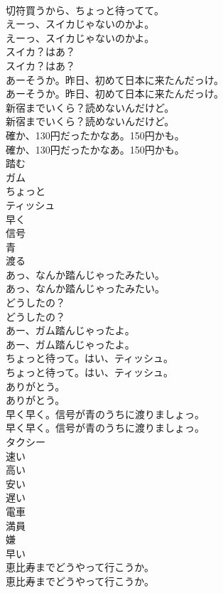 \documentclass[8pt]{extreport}
\begin{document}
\begin{CJK}{UTF8}{min}
\\	切符買うから、ちょっと待ってて。 
\\	えーっ、スイカじゃないのかよ。	
\\	えーっ、スイカじゃないのかよ。 
\\	スイカ？はあ？	
\\	スイカ？はあ？ 
\\	あーそうか。昨日、初めて日本に来たんだっけ。	
\\	あーそうか。昨日、初めて日本に来たんだっけ。 
\\	新宿までいくら？読めないんだけど。	
\\	新宿までいくら？読めないんだけど。 
\\	確か、130円だったかなあ。150円かも。	
\\	確か、130円だったかなあ。150円かも。 
\\	踏む
\\	ガム
\\	ちょっと
\\	ティッシュ
\\	早く
\\	信号
\\	青
\\	渡る
\\	あっ、なんか踏んじゃったみたい。	
\\	あっ、なんか踏んじゃったみたい。 
\\	どうしたの？	
\\	どうしたの？ 
\\	あー、ガム踏んじゃったよ。	
\\	あー、ガム踏んじゃったよ。 
\\	ちょっと待って。はい、ティッシュ。	
\\	ちょっと待って。はい、ティッシュ。 
\\	ありがとう。	
\\	ありがとう。 
\\	早く早く。信号が青のうちに渡りましょっ。	
\\	早く早く。信号が青のうちに渡りましょっ。 
\\	タクシー
\\	速い
\\	高い
\\	安い
\\	遅い
\\	電車
\\	満員
\\	嫌
\\	早い
\\	恵比寿までどうやって行こうか。	
\\	恵比寿までどうやって行こうか。 

\end{CJK}
\end{document}
